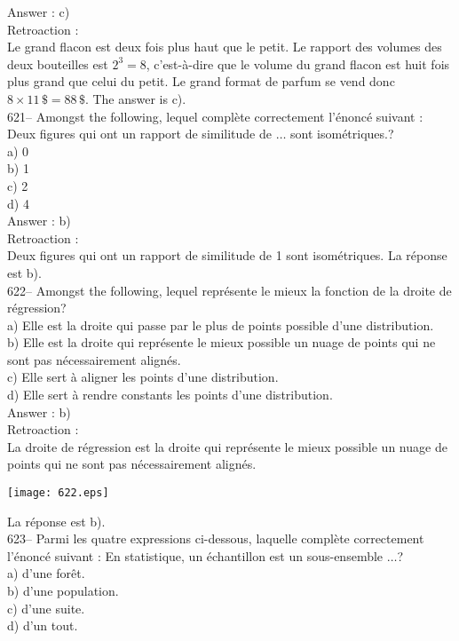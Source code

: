 ﻿\documentclass[letterpaper, 12pt]{article}
\begin{document}
Answer : c)\\

Retroaction : \\
Le grand flacon est deux fois plus haut que le petit. Le rapport des volumes
des deux bouteilles est $2^{3}=8$, c'est-\`a-dire que le volume du grand
flacon est huit fois plus grand que celui du petit.  Le grand format de
parfum se vend donc $8\times11\,\$=88\,\$$.  The answer is c).\\


621-- Amongst the following, lequel compl\`ete
correctement l'\'enonc\'e suivant : \og Deux figures qui ont un
rapport de similitude de $\ldots$ sont isom\'etriques.\fg?\\
a) 0\\
b) 1\\
c) 2\\
d) 4\\

Answer : b) \\

Retroaction : \\
Deux figures qui ont un rapport de similitude de 1 sont isom\'etriques.  La
r\'eponse est b).\\


622-- Amongst the following, lequel repr\'esente le mieux la
fonction de la droite de r\'egression?\\
a) Elle est la droite qui passe par le plus de points possible d'une
distribution.\\
b) Elle est la droite qui repr\'esente le mieux possible un nuage de points
qui ne sont pas n\'ecessairement align\'es.\\
c) Elle sert \`a aligner les points d'une distribution.\\
d) Elle sert \`a rendre constants les points d'une distribution.\\

Answer : b)\\

Retroaction : \\
La droite de r\'egression est la droite qui repr\'esente le mieux
possible un nuage de points qui ne sont pas n\'ecessairement
align\'es.   \begin{center}
    \texttt{[image: 622.eps]}
    \end{center}  La r\'eponse
est b).\\


623-- Parmi les quatre expressions ci-dessous, laquelle compl\`ete
correctement l'\'enonc\'e suivant : \og En statistique, un
\'echantillon est un sous-ensemble $\ldots$\fg ?\\
a) d'une for\^et.\\
b) d'une population.\\
c) d'une suite.\\
d) d'un tout.\\
\end{document}
